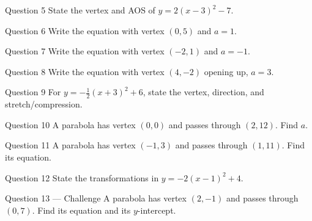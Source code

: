 \documentclass[11pt]{article}
\begin{document}
\begin{qbox}{Question 5}
State the vertex and AOS of $y=2(x-3)^2-7$.\workspace{2.0cm}
\end{qbox}

\begin{qbox}{Question 6}
Write the equation with vertex $(0,5)$ and $a=1$.\workspace{1.8cm}
\end{qbox}

\begin{qbox}{Question 7}
Write the equation with vertex $(-2,1)$ and $a=-1$.\workspace{1.8cm}
\end{qbox}

\begin{qbox}{Question 8}
Write the equation with vertex $(4,-2)$ opening up, $a=3$.\workspace{1.8cm}
\end{qbox}

\begin{qbox}{Question 9}
For $y=-\tfrac12(x+3)^2+6$, state the vertex, direction, and stretch/compression.\workspace{2.2cm}
\end{qbox}

\begin{qbox}{Question 10}
A parabola has vertex $(0,0)$ and passes through $(2,12)$. Find $a$.\workspace{2.2cm}
\end{qbox}

\begin{qbox}{Question 11}
A parabola has vertex $(-1,3)$ and passes through $(1,11)$. Find its equation.\workspace{2.4cm}
\end{qbox}

\begin{qbox}{Question 12}
State the transformations in $y=-2(x-1)^2+4$.\workspace{2.2cm}
\end{qbox}

\begin{qbox}{Question 13 --- Challenge}
A parabola has vertex $(2,-1)$ and passes through $(0,7)$. Find its equation and its $y$-intercept.\workspace{3.0cm}
\end{qbox}

\clearpage
{}
\end{document}
